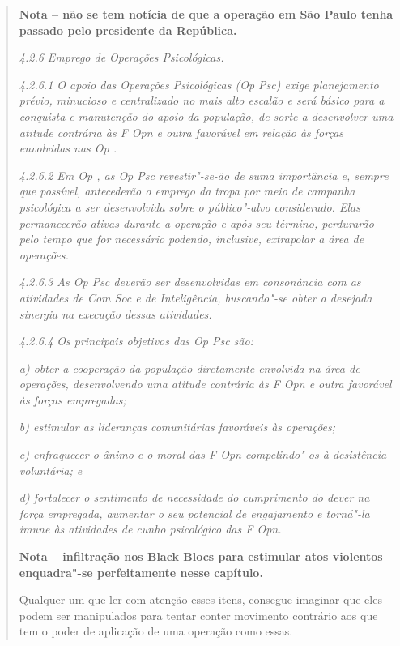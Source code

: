 \begin{quote}
\textbf{Nota -- não se tem notícia de que a operação em São Paulo tenha
passado pelo presidente da República.~}

\emph{4.2.6 Emprego de Operações Psicológicas.}

\emph{4.2.6.1 O apoio das Operações Psicológicas (Op Psc) exige
planejamento prévio, minucioso e centralizado no mais alto escalão e
será básico para a conquista e manutenção do apoio da população, de
sorte a desenvolver uma atitude contrária às F Opn e outra favorável em
relação às forças envolvidas nas Op .}

\emph{4.2.6.2 Em Op , as Op Psc revestir"-se-ão de suma importância e,
sempre que possível, antecederão o emprego da tropa por meio de campanha
psicológica a ser desenvolvida sobre o público"-alvo considerado. Elas
permanecerão ativas durante a operação e após seu término, perdurarão
pelo tempo que for necessário podendo, inclusive, extrapolar a área de
operações.}

\emph{4.2.6.3 As Op Psc deverão ser desenvolvidas em consonância com as
atividades de Com Soc e de Inteligência, buscando"-se obter a desejada
sinergia na execução dessas atividades.}

\emph{4.2.6.4 Os principais objetivos das Op Psc são:}

\emph{a) obter a cooperação da população diretamente envolvida na área
de operações, desenvolvendo uma atitude contrária às F Opn e outra
favorável às forças empregadas;}

\emph{b) estimular as lideranças comunitárias favoráveis às operações;}

\emph{c) enfraquecer o ânimo e o moral das F Opn compelindo"-os à
desistência voluntária; e}

\emph{d) fortalecer o sentimento de necessidade do cumprimento do dever
na força empregada, aumentar o seu potencial de engajamento e torná"-la
imune às atividades de cunho psicológico das F Opn.}

\textbf{Nota -- infiltração nos Black Blocs para estimular atos
violentos enquadra"-se perfeitamente nesse capítulo.}

Qualquer um que ler com atenção esses itens, consegue imaginar que eles
podem ser manipulados para tentar conter  movimento contrário
aos que tem o poder de aplicação de uma operação como essas.
\end{quote}
